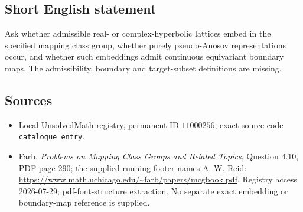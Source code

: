 \documentclass[11pt]{article}
\begin{document}
\subsection{Short English statement}
Ask whether admissible real- or complex-hyperbolic lattices embed in the specified mapping class group, whether purely pseudo-Anosov representations occur, and whether such embeddings admit continuous equivariant boundary maps. The admissibility, boundary and target-subset definitions are missing.
\subsection{Sources}
\begin{itemize}
\item Local UnsolvedMath registry, permanent ID \(11000256\), exact source code \texttt{catalogue entry}.
\item Farb, \emph{Problems on Mapping Class Groups and Related Topics}, Question 4.10, PDF page 290; the supplied running footer names A. W. Reid: \url{https://www.math.uchicago.edu/~farb/papers/mcgbook.pdf}. Registry access 2026-07-29; pdf-font-structure extraction. No separate exact embedding or boundary-map reference is supplied.
\end{itemize}
\end{document}
